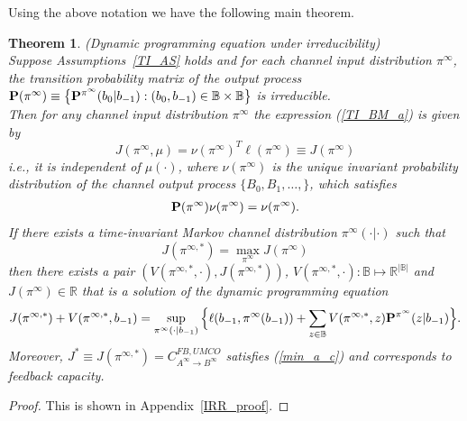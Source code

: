 \documentclass[11pt, a4paper, journal,onecolumn]{IEEEtran}
\newcommand{\mb}{\mathbb}
\newcommand{\rar}{\rightarrow}
\newcommand{\bea}{\begin{eqnarray}}
\newcommand{\eea}{\end{eqnarray}}
\newtheorem{theorem}{Theorem}[section]
\begin{document}
Using the above notation we have the following main theorem.\\

\begin{theorem}(Dynamic programming equation under irreducibility)\\
\label{IRR}
Suppose Assumptions~\ref{TI_AS} holds and  for each channel input distribution $\pi^{\infty}$,  the transition probability matrix of the output process  ${\bf P}(\pi^{\infty}) \equiv \big\{ {\bf P}^{\pi^\infty}(b_0|b_{-1}): (b_0, b_{-1})\in {\mathbb B} \times {\mathbb B}\big\}$ is  irreducible.  \\
Then for any channel input distribution $\pi^{\infty}$ the expression (\ref{TI_BM_a}) is given by  
\begin{equation}
J(\pi^{\infty}, \mu)= \nu(\pi^{\infty})^T\ell(\pi^{\infty})\equiv J(\pi^\infty)
\end{equation}
i.e., it is independent of $\mu(\cdot)$, where $\nu(\pi^{\infty})$ is the unique invariant probability distribution of the channel output process $\{B_0, B_1, \ldots, \}$, which satisfies  
\bea
{\bf P}(\pi^{\infty})\nu(\pi^{\infty})=\nu(\pi^{\infty}).
\eea
If there exists a time-invariant Markov channel distribution $\pi^\infty(\cdot|\cdot)$ such that 
\begin{equation*}
J(\pi^{\infty, *})=\max_{\pi^\infty}J(\pi^\infty)
\end{equation*}
then there exists a pair $(V(\pi^{\infty,*},\cdot),J(\pi^{\infty,*}))$, $V(\pi^{\infty, *},\cdot):\mathbb{B}\mapsto \mathbb{R}^{|\mathbb{B}|}$ and $J(\pi^\infty)\in \mathbb{R}$ that is a solution of the dynamic programming equation
\begin{equation}
J(\pi^{\infty,*})+V(\pi^{\infty,*},b_{-1})=\sup_{\pi^\infty(\cdot|b_{-1})}\Big\{\ell(b_{-1},\pi^\infty(b_{-1}))+\sum_{z \in {\mb B}}V(\pi^{\infty, *},z){\bf P}^{\pi^\infty}(z|b_{-1})\Big\}.\label{IR_DP_1}
\end{equation}
Moreover, $J^* \equiv J(\pi^{\infty,*})=C_{A^\infty \rar B^\infty}^{FB,UMCO}$ satisfies (\ref{min_a_c}) and corresponds to feedback capacity.
\end{theorem}
\begin{proof} This is  shown in Appendix~\ref{IRR_proof}.
\end{proof}

\ \
\end{document}
